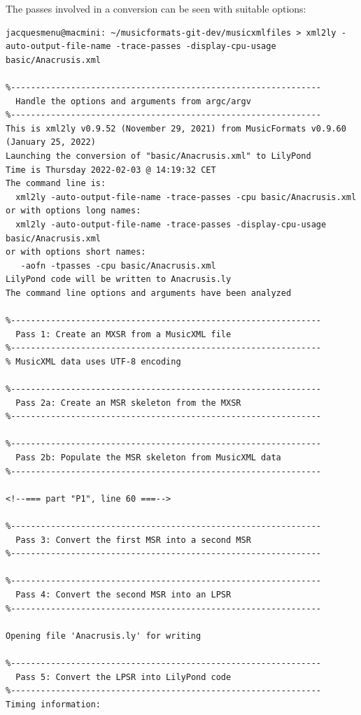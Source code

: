 The passes involved in a conversion can be seen with suitable %
options:
\begin{lstlisting}[language=Terminal]
jacquesmenu@macmini: ~/musicformats-git-dev/musicxmlfiles > xml2ly -auto-output-file-name -trace-passes -display-cpu-usage basic/Anacrusis.xml

%--------------------------------------------------------------
  Handle the options and arguments from argc/argv
%--------------------------------------------------------------
This is xml2ly v0.9.52 (November 29, 2021) from MusicFormats v0.9.60 (January 25, 2022)
Launching the conversion of "basic/Anacrusis.xml" to LilyPond
Time is Thursday 2022-02-03 @ 14:19:32 CET
The command line is:
  xml2ly -auto-output-file-name -trace-passes -cpu basic/Anacrusis.xml
or with options long names:
  xml2ly -auto-output-file-name -trace-passes -display-cpu-usage basic/Anacrusis.xml
or with options short names:
   -aofn -tpasses -cpu basic/Anacrusis.xml
LilyPond code will be written to Anacrusis.ly
The command line options and arguments have been analyzed

%--------------------------------------------------------------
  Pass 1: Create an MXSR from a MusicXML file
%--------------------------------------------------------------
% MusicXML data uses UTF-8 encoding

%--------------------------------------------------------------
  Pass 2a: Create an MSR skeleton from the MXSR
%--------------------------------------------------------------

%--------------------------------------------------------------
  Pass 2b: Populate the MSR skeleton from MusicXML data
%--------------------------------------------------------------

<!--=== part "P1", line 60 ===-->

%--------------------------------------------------------------
  Pass 3: Convert the first MSR into a second MSR
%--------------------------------------------------------------

%--------------------------------------------------------------
  Pass 4: Convert the second MSR into an LPSR
%--------------------------------------------------------------

Opening file 'Anacrusis.ly' for writing

%--------------------------------------------------------------
  Pass 5: Convert the LPSR into LilyPond code
%--------------------------------------------------------------
Timing information:


\end{lstlisting}
